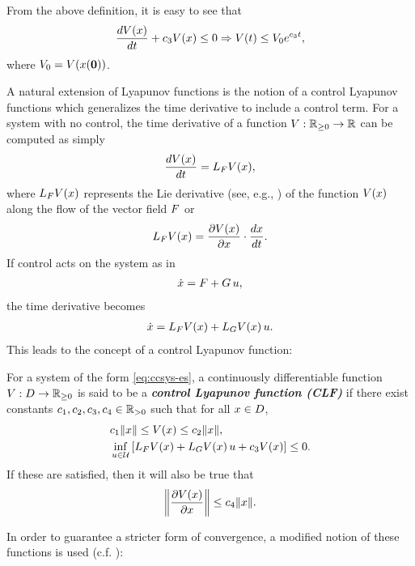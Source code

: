 From the above definition, it is easy to see that
\begin{align}
  \frac{dV(x)}{dt} + c_{3} V(x) \leq 0 \Rightarrow V(t) \leq V_{0} e^{c_{3} t},
\end{align}
where $V_{0} = V(x({\mathbf 0}))$.

A natural extension of Lyapunov functions is the notion of a control Lyapunov
functions which generalizes the time derivative to include a control term.
%
For a system with no control, the time derivative of a function $V : \mathbb{R}_{\geq 0} \to \mathbb{R}$ can be
computed as simply
\begin{align*}
  \frac{dV(x)}{dt} = L_{F} V(x),
\end{align*}
where $L_{F} V(x)$ represents the Lie derivative (see, e.g.,
\cite{Sastry1999}) of the function $V(x)$ along the flow of the vector field
$F$ or
\begin{align}
  L_{F} V(x) = \frac{\partial{V(x)}}{\partial{x}} \cdot \frac{dx}{dt}.
\end{align}
%
If control acts on the system as in
\begin{align}
  \label{eq:ccsys-es}
  {\dot {x}} = F + G \, u,
\end{align}
the time derivative becomes
\begin{align}
  {\dot {x}} = L_{F} V(x) + L_{G} V(x) \, u.
\end{align}
%
This leads to the concept of a control Lyapunov function:
%
\begin{definition}
  \label{def:res-clf}
  For a system of the form \eqref{eq:ccsys-es}, a continuously differentiable
  function $V : D \to \mathbb{R}_{\geq 0}$ is said to be a {\bf \em control Lyapunov function
    (CLF)} if there exist constants $c_{1}, c_{2}, c_{3}, c_{4} \in \mathbb{R}_{> 0}$ such
  that for all $x \in D$,
  \begin{eqnarray}
    &c_{1} \|x\| \leq V(x) \leq c_{2} \|x\|,\\
    \nonumber
    &\inf_{u \in \mathcal{U}} \left[ L_{F} V(x) + L_{G} V(x) \, u + c_{3} V(x) \right] \leq 0.
  \end{eqnarray}
  If these are satisfied, then it will also be true that
  \begin{align}
    \label{eq:dVedx-bounds}
    \left\| \frac{\partial{V(x)}}{\partial{x}} \right\| \leq c_{4} \|x\|.
  \end{align}
\end{definition}

% 
In order to guarantee a stricter form of convergence, a modified notion of these
functions is used (c.f. \cite{Ames2014}):

